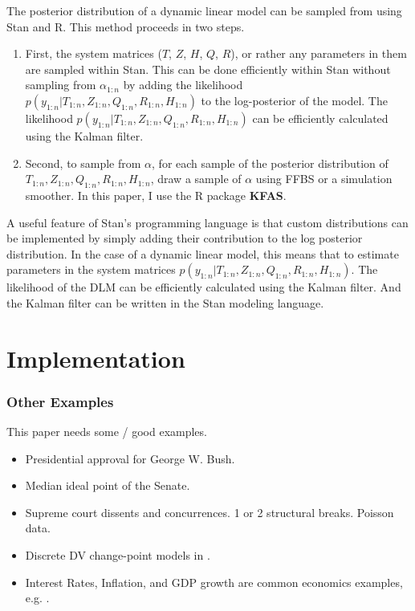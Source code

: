 \documentclass{article}
\begin{document}
\begin{itemize}
The posterior distribution of a dynamic linear model can be sampled from using Stan and R.
This method proceeds in two steps.
\begin{enumerate}
\item First, the system matrices ($T$, $Z$, $H$, $Q$, $R$), or rather any parameters in them are sampled within Stan. This can be done efficiently within Stan without sampling from $\alpha_{1:n}$ by adding the likelihood $p(y_{1:n} | T_{1:n}, Z_{1:n}, Q_{1:n}, R_{1:n}, H_{1:n})$ to the log-posterior of the model.
The likelihood $p(y_{1:n} | T_{1:n}, Z_{1:n}, Q_{1:n}, R_{1:n}, H_{1:n})$ can be efficiently calculated using the Kalman filter.
\item Second, to sample from $\alpha$, for each sample of the posterior distribution of $T_{1:n}, Z_{1:n}, Q_{1:n}, R_{1:n}, H_{1:n}$, draw a sample of $\alpha$ using FFBS or a simulation smoother. In this paper, I use the R package \textbf{KFAS}.
\end{enumerate}

A useful feature of Stan's programming language is that custom distributions can be implemented by simply adding their contribution to the log posterior distribution.
In the case of a dynamic linear model, this means that to estimate parameters in the system matrices  $p(y_{1:n} | T_{1:n}, Z_{1:n}, Q_{1:n}, R_{1:n}, H_{1:n})$.
The likelihood of the DLM can be efficiently calculated using the Kalman filter. 
And the Kalman filter can be written in the Stan modeling language.

\section{Implementation}
\label{sec:implementation}

\clearpage{}

\subsubsection{Other Examples}

This paper needs some / good examples.

\begin{itemize}
\item Presidential approval for George W. Bush. \parencites{RatkovicEng2010}
\item Median ideal point of the Senate. \parencites{RatkovicEng2010}
\item Supreme court dissents and concurrences. 1 or 2 structural breaks. Poisson data. \parencite{CalderiaZorn1998}
\item Discrete DV change-point models in \parencite{spirling2007bayesian}.
\item Interest Rates, Inflation, and GDP growth are common economics examples, e.g. \textcite{GiordaniKohn2008}.
\end{itemize}


\end{itemize}
\end{document}
